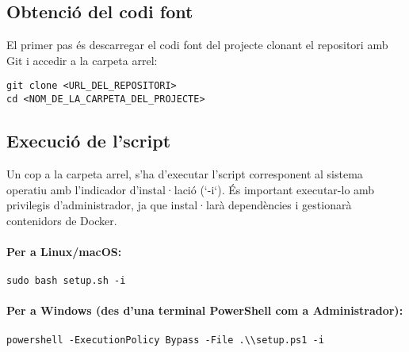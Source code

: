 \subsection{Obtenció del codi font}
El primer pas és descarregar el codi font del projecte clonant el repositori amb Git i accedir a la carpeta arrel:
\begin{verbatim}
git clone <URL_DEL_REPOSITORI>
cd <NOM_DE_LA_CARPETA_DEL_PROJECTE>
\end{verbatim}

\subsection{Execució de l'script}
Un cop a la carpeta arrel, s'ha d'executar l'script corresponent al sistema operatiu amb l'indicador d'instal·lació (`-i`). És important executar-lo amb privilegis d'administrador, ja que instal·larà dependències i gestionarà contenidors de Docker.

\paragraph{Per a Linux/macOS:}
\begin{verbatim}
sudo bash setup.sh -i
\end{verbatim}

\paragraph{Per a Windows (des d'una terminal PowerShell com a Administrador):}
\begin{verbatim}
powershell -ExecutionPolicy Bypass -File .\\setup.ps1 -i
\end{verbatim}

